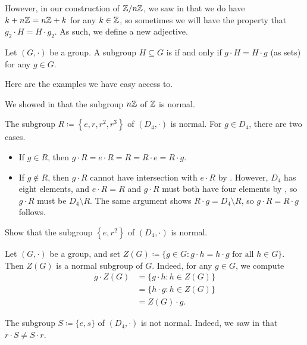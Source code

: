\documentclass[../main.tex]{subfiles}
\begin{document}
However, in our construction of $\mathbb Z/n\mathbb Z$, we saw in  that we do have $k+n\mathbb Z=n\mathbb Z+k$ for any $k\in\mathbb Z$, so sometimes we will have the property that $g_2\cdot H=H\cdot g_2$. As such, we define a new adjective.
\begin{definition}[normal]
    Let $(G,\cdot)$ be a group. A subgroup $H\subseteq G$ is  if and only if $g\cdot H=H\cdot g$ (as sets) for any $g\in G$.
\end{definition}
Here are the examples we have easy access to.
\begin{example}
    We showed in  that the subgroup $n\mathbb Z$ of $\mathbb Z$ is normal.
\end{example}
\begin{example}
    The subgroup $R\coloneqq\left\{e,r,r^2,r^3\right\}$ of $(D_4,\cdot)$ is normal. For $g\in D_4$, there are two cases.
    \begin{itemize}
        \item If $g\in R$, then $g\cdot R=e\cdot R=R=R\cdot e=R\cdot g$.
        \item If $g\notin R$, then $g\cdot R$ cannot have intersection with $e\cdot R$ by . However, $D_4$ has eight elements, and $e\cdot R=R$ and $g\cdot R$ must both have four elements by , so $g\cdot R$ must be $D_4\setminus R$. The same argument shows $R\cdot g=D_4\setminus R$, so $g\cdot R=R\cdot g$ follows.
    \end{itemize}
\end{example}
\begin{exercise}
    Show that the subgroup $\left\{e,r^2\right\}$ of $(D_4,\cdot)$ is normal.
\end{exercise}
\begin{example}
    Let $(G,\cdot)$ be a group, and set $Z(G)\coloneqq\{g\in G:g\cdot h=h\cdot g\text{ for all }h\in G\}$. Then $Z(G)$ is a normal subgroup of $G$. Indeed, for any $g\in G$, we compute
    \begin{align*}
        g\cdot Z(G) &= \{g\cdot h:h\in Z(G)\} \\
        &= \{h\cdot g:h\in Z(G)\} \\
        &= Z(G)\cdot g.
    \end{align*}
\end{example}
\begin{nex}
    The subgroup $S\coloneqq\{e,s\}$ of $(D_4,\cdot)$ is not normal. Indeed, we saw in  that $r\cdot S\ne S\cdot r$.
\end{nex}
\end{document}
